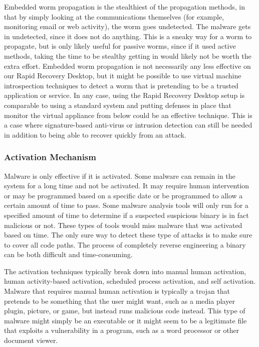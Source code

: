 Embedded worm propagation is the stealthiest of the propagation methods, in that by simply looking at the communications themselves (for example, monitoring email or web activity), the worm goes undetected. The malware gets in undetected, since it does not do anything. This is a sneaky way for a worm to propagate, but is only likely useful for passive worms, since if it used active methods, taking the time to be stealthy getting in would likely not be worth the extra effort. Embedded worm propagation is not necessarily any less effective on our Rapid Recovery Desktop, but it might be possible to use virtual machine introspection techniques to detect a worm that is pretending to be a trusted application or service. In any case, using the Rapid Recovery Desktop setup is comparable to using a standard system and putting defenses in place that monitor the virtual appliance from below could be an effective technique. This is a case where signature-based anti-virus or intrusion detection can still be needed in addition to being able to recover quickly from an attack.

\subsubsection{Activation Mechanism}

Malware is only effective if it is activated. Some malware can remain in the system for a long time and not be activated. It may require human intervention or may be programmed based on a specific date or be programmed to allow a certain amount of time to pass. Some malware analysis tools will only run for a specified amount of time to determine if a suspected suspicious binary is in fact malicious or not. These types of tools would miss malware that was activated based on time. The only sure way to detect these type of attacks is to make sure to cover all code paths. The process of completely reverse engineering a binary can be both difficult and time-consuming. 

The activation techniques typically break down into manual human activation, human activity-based activation, scheduled process activation, and self activation. Malware that requires manual human activation is typically a trojan that pretends to be something that the user might want, such as a media player plugin, picture, or game, but instead runs malicious code instead. This type of malware might simply be an executable or it might seem to be a legitimate file that exploits a vulnerability in a program, such as a word processor or other document viewer. 

